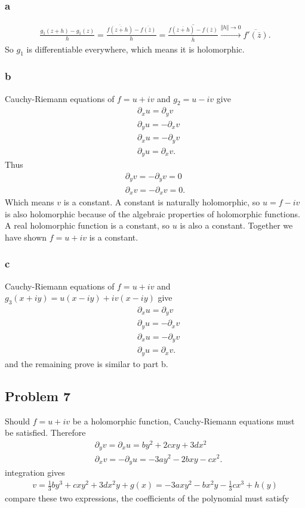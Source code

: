 \documentclass{article}
\begin{document}
\subsubsection*{a}
\begin{align*}
	\frac{g_1(z+h)-g_1(z)}{h}=\frac{\overline{f(\overline{z+h})}-\overline{f(\overline{z})}}{h}=\overline{\frac{f(\overline{z+h})-f(\overline{z})}{\overline{h}}}\overset{\Vert h \Vert\rightarrow 0}{\longrightarrow}\overline{f'(\overline{z})}.
\end{align*}
So $g_1$ is differentiable everywhere, which means it is holomorphic.

\subsubsection*{b}
Cauchy-Riemann equations of $f=u+iv$ and $g_2=u-iv$ give
\begin{align*}
	&\partial_x u=\partial_y v \\
	&\partial_y u=-\partial_x v \\
	&\partial_x u=-\partial_y v \\
	&\partial_y u=\partial_x v.
\end{align*}
Thus 
\begin{align*}
	\partial_y v=-\partial_y v =0 \\
	\partial_x v=-\partial_x v=0.
\end{align*}
Which means $v$ is a constant. A constant is naturally holomorphic, so $u=f-iv$ is also holomorphic because of the algebraic properties of holomorphic functions. A real holomorphic function is a constant, so $u$ is also a constant. Together we have shown $f=u+iv$ is a constant.


\subsubsection*{c}
Cauchy-Riemann equations of $f=u+iv$ and $g_3(x+iy)=u(x-iy)+iv(x-iy)$ give
\begin{align*}
	&\partial_x u=\partial_y v \\
	&\partial_y u=-\partial_x v \\
	&\partial_x u=-\partial_y v \\
	&\partial_y u=\partial_x v.
\end{align*}
and the remaining prove is similar to part b.

\subsection*{Problem 7}
Should $f=u+iv$ be a holomorphic function, Cauchy-Riemann equations must be satisfied. Therefore
\begin{align*}
	&\partial_y v=\partial_x u=by^2+2cxy+3dx^2 \\
	&\partial_x v=-\partial_y u=-3ay^2-2bxy-cx^2.
\end{align*}
integration gives
\begin{align*}
	v=\frac{1}{3}by^3+cxy^2+3dx^2y+g(x)=-3axy^2-bx^2y-\frac{1}{3}cx^3+h(y)
\end{align*}
compare these two expressions, the coefficients of the polynomial must satisfy
\end{document}
